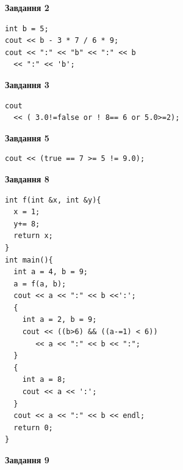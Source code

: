 \documentclass[12pt, ukrainian]{article}
\begin{document}
{\begin {large}
\begin{minipage}[t]{7.0cm}
\end{minipage}
\vline \hspace{1mm}
\begin{minipage}[t]{11.0cm}

\begin{center}
\textbf{Завдання 2}
\end{center}
\vspace{-8mm}

\begin{verbatim}
int b = 5;
cout << b - 3 * 7 / 6 * 9;
cout << ":" << "b" << ":" << b 
  << ":" << 'b';
\end{verbatim}



\begin{center}
\textbf{Завдання 3}
\end{center}
\vspace{-8mm}

\begin{verbatim}
cout 
  << ( 3.0!=false or ! 8== 6 or 5.0>=2);
\end{verbatim}



\begin{center}
\textbf{Завдання 5}
\end{center}
\vspace{-8mm}

\begin{verbatim}
cout << (true == 7 >= 5 != 9.0);
\end{verbatim}



\begin{center}
\textbf{Завдання 8}
\end{center}
\vspace{-8mm}

\begin{verbatim}
int f(int &x, int &y){
  x = 1;
  y+= 8;
  return x;
}
int main(){
  int a = 4, b = 9;
  a = f(a, b);
  cout << a << ":" << b <<':';
  {
    int a = 2, b = 9;
    cout << ((b>6) && ((a-=1) < 6))
       << a << ":" << b << ":";
  }
  {
    int a = 8;
    cout << a << ':';
  }
  cout << a << ":" << b << endl;
  return 0;
}
\end{verbatim}

\end{minipage}


\begin{minipage}[t]{7.0cm}

\begin{center}
\textbf{Завдання 9}
\end{center}
\vspace{-8mm}


\end{minipage}
\end{large}}
\end{document}
